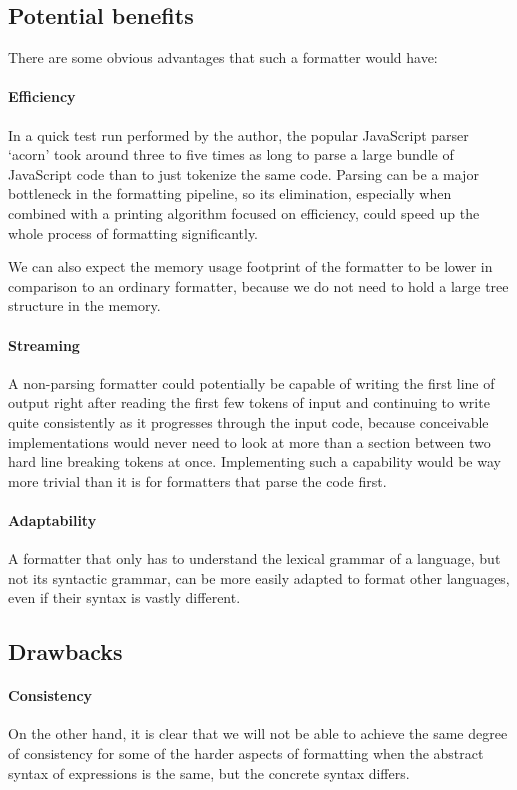 \subsection{Potential benefits}
There are some obvious advantages that such a formatter would have:

\paragraph{Efficiency}
In a quick test run performed by the author, the popular JavaScript parser `acorn'
took around three to five times as long to parse a large bundle of JavaScript code
than to just tokenize the same code.
Parsing can be a major bottleneck in the formatting pipeline,
so its elimination, especially when combined with a printing algorithm focused on efficiency,
could speed up the whole process of formatting significantly.

We can also expect the memory usage footprint of the formatter
to be lower in comparison to an ordinary formatter,
because we do not need to hold a large tree structure in the memory.

\paragraph{Streaming}
A non-parsing formatter could potentially be capable of writing the first line of output
right after reading the first few tokens of input and continuing to write quite consistently
as it progresses through the input code, because conceivable implementations would never
need to look at more than a section between two hard line breaking tokens at once.
Implementing such a capability would be way more trivial than it is for
formatters that parse the code first.

\paragraph{Adaptability}
A formatter that only has to understand the lexical grammar of a language,
but not its syntactic grammar, can be more easily adapted to format other languages,
even if their syntax is vastly different.

\subsection{Drawbacks}
\paragraph{Consistency}
On the other hand, it is clear that we will not be able to achieve the same degree of consistency
for some of the harder aspects of formatting
when the abstract syntax of expressions is the same,
but the concrete syntax differs.


